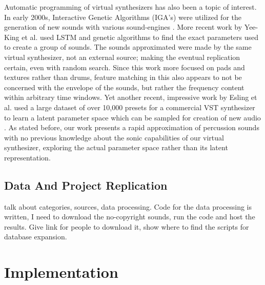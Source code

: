 \documentclass{nime-alternate} %
\begin{document}
Automatic programming of virtual synthesizers has also been a topic of interest. In early 2000s, Interactive Genetic Algorithms (IGA's) were utilized for the generation of new sounds with various sound-engines \cite{johnson1999exploring,dahlstedt2001creating}. More recent work by Yee-King et al. \cite{yee2018automatic} used LSTM and genetic algorithms to find the exact parameters used to create a group of sounds. The sounds approximated were made by the same virtual synthesizer, not an external source; making the eventual replication certain, even with random search. Since this work more focused on pads and textures rather than drums, feature matching in this also appears to not be concerned with the envelope of the sounds, but rather the frequency content within arbitrary time windows. Yet another recent, impressive work by Esling et al. used a large dataset of over 10,000 presets for a commercial VST synthesizer to learn a latent parameter space which can be sampled for creation of new audio \cite{esling2019universal}. As stated before, our work presents a rapid approximation of percussion sounds with no previous knowledge about the sonic capabilities of our virtual synthesizer, exploring the actual parameter space rather than its latent representation. 


\subsection{Data And Project Replication}
\label{data}

talk about  categories, sources, data processing. 
Code for the data processing is written, I need to download the no-copyright sounds, run the code and host the results. 
Give link for people to download it, show where to find the scripts for database expansion.
\section{Implementation}
\label{impl}
\end{document}
